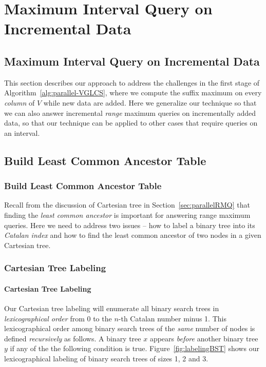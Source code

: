 \ifdefined\MasterThesis
\chapter{Maximum Interval Query on Incremental Data}
\else
\section{Maximum Interval Query on Incremental Data}
\fi
\label{sec:QIUD}

This section describes our approach to address the challenges in the
first stage of Algorithm~\ref{alg:parallel-VGLCS}, where we compute
the suffix maximum on every {\em column} of $V$ while new data are
added.  Here we generalize our technique so that we can also answer
incremental {\em range} maximum queries on incrementally added data,
so that our technique can be applied to other cases that require
queries on an interval.

%

\ifdefined\MasterThesis
\section{Build Least Common Ancestor Table}
\else
\subsection{Build Least Common Ancestor Table}
\fi

Recall from the discussion of Cartesian tree in
Section~\ref{sec:parallelRMQ} that finding the {\em least common
ancestor} is important for answering range maximum queries.  Here we
need to address two issues -- how to label a binary tree into its {\em
Catalan index} and how to find the least common ancestor of two nodes in
a given Cartesian tree.

\ifdefined\MasterThesis
\subsection{Cartesian Tree Labeling}
\else
\subsubsection{Cartesian Tree Labeling}
\fi

Our Cartesian tree labeling will enumerate all binary search trees in
{\em lexicographical order} from $0$ to the $n$-th Catalan number
minus 1.  This lexicographical order among binary search trees of the
{\em same} number of nodes is defined {\em recursively} as follows.  A
binary tree $x$ appears {\em before} another binary tree $y$ if any of
the the following condition is true.  Figure~\ref{fig:labelingBST}
shows our lexicographical labeling of binary search trees of sizes 1,
2 and 3.

